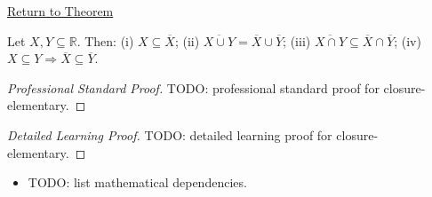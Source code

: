 \newpage
{}
\label{prf:closure-elementary}

\begin{remark*}[Return]
\hyperref[lem:closure-elementary]{Return to Theorem}
\end{remark*}

\begin{lemma*}
Let $X, Y \subseteq \mathbb{R}$. Then: (i) $X \subseteq \overline{X}$;
(ii) $\overline{X \cup Y} = \overline{X} \cup \overline{Y}$;
(iii) $\overline{X \cap Y} \subseteq \overline{X} \cap \overline{Y}$;
(iv) $X \subseteq Y \Rightarrow \overline{X} \subseteq \overline{Y}$.

\smallskip\noindent
\end{lemma*}

\begin{proof}[Professional Standard Proof]
\LRAProofBodyStart
TODO: professional standard proof for closure-elementary.
\end{proof}

\begin{proof}[Detailed Learning Proof]
\LRAProofBodyStart
TODO: detailed learning proof for closure-elementary.
\end{proof}

\begin{remark*}
\end{remark*}

\begin{dependencies}
\begin{itemize}
  \item TODO: list mathematical dependencies.
\end{itemize}
\end{dependencies}

\clearpage
